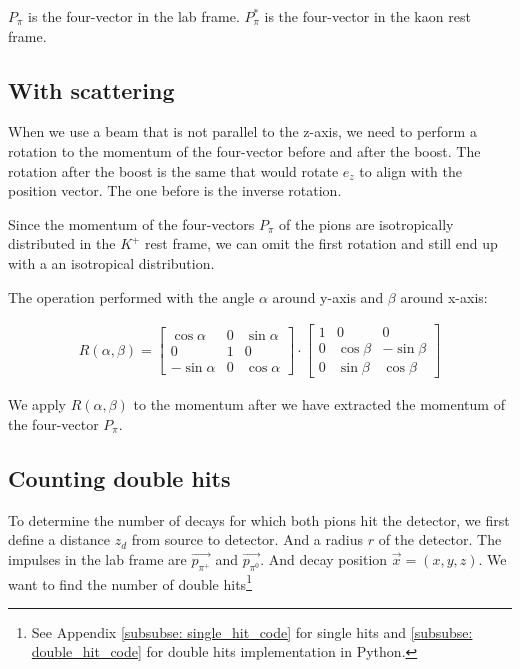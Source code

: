 \documentclass[12pt,a4paper,oneside,english]{article}
\begin{document}
		$P_{\pi}$ is the four-vector in the lab frame. $P_{\pi}^*$ is the four-vector in the kaon rest frame. 
	
	\subsection{With scattering}
	
		When we use a beam that is not parallel to the z-axis, we need to perform a rotation to the momentum of the four-vector before and after the boost. The rotation after the boost is the same that would rotate $e_z$ to align with the position vector. The one before is the inverse rotation.
		
		Since the momentum of the four-vectors $P_{\pi}$ of the pions are isotropically distributed in the  $K^+$ rest frame, we can omit the first rotation and still end up with a an isotropical distribution.
		
		The operation performed with the angle $\alpha$ around y-axis and $\beta$ around x-axis:
		
		\begin{align}
				R(\alpha, \beta) = \begin{bmatrix}
				\cos \alpha  & 0 & \sin \alpha \\
				0         & 1 &  0          \\
				-\sin \alpha & 0 & \cos \alpha
				\end{bmatrix} \cdot \begin{bmatrix}
				1 &   0         & 0           \\
				0 & \cos \beta & -\sin \beta \\
				0 & \sin \beta &  \cos \beta
				\end{bmatrix}
		\end{align}
		
		We apply $R(\alpha, \beta)$ to the momentum after we have extracted	the momentum of the four-vector $P_{\pi}$.
		
		\subsection{Counting double hits}
		\label{hits}
		
		To determine the number of decays for which both pions hit the detector, we first define a distance $z_d$ from source to detector. And a radius $r$ of the detector. The impulses in the lab frame are $\overrightarrow{p_{\pi^+}}$ and $\overrightarrow{p_{\pi^0}}$. And decay position $\overrightarrow{x} = (x, y, z)$. We want to find the number of double hits\footnote{See Appendix		\ref{subsubse: single_hit_code} for single hits and
		\ref{subsubse: double_hit_code} for double hits implementation in Python.}
				
\end{document}

